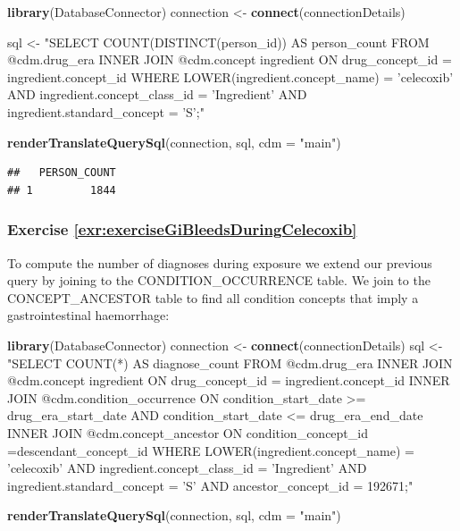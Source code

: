 \documentclass[11pt]{book}
\newenvironment{Shaded}{\begin{snugshade}}{\end{snugshade}}
\newcommand{\KeywordTok}[1]{\textcolor[rgb]{0.13,0.29,0.53}{\textbf{#1}}}
\newcommand{\DataTypeTok}[1]{\textcolor[rgb]{0.13,0.29,0.53}{#1}}
\newcommand{\StringTok}[1]{\textcolor[rgb]{0.31,0.60,0.02}{#1}}
\newcommand{\NormalTok}[1]{#1}
\theoremstyle{definition}
\theoremstyle{definition}
\theoremstyle{definition}
\theoremstyle{remark}
\begin{document}
\begin{Shaded}
\begin{Highlighting}[]
\KeywordTok{library}\NormalTok{(DatabaseConnector)}
\NormalTok{connection <-}\StringTok{ }\KeywordTok{connect}\NormalTok{(connectionDetails)}

\NormalTok{sql <-}\StringTok{ "SELECT COUNT(DISTINCT(person_id)) AS person_count}
\StringTok{FROM @cdm.drug_era}
\StringTok{INNER JOIN @cdm.concept ingredient}
\StringTok{  ON drug_concept_id = ingredient.concept_id}
\StringTok{WHERE LOWER(ingredient.concept_name) = 'celecoxib'}
\StringTok{  AND ingredient.concept_class_id = 'Ingredient'}
\StringTok{  AND ingredient.standard_concept = 'S';"}

\KeywordTok{renderTranslateQuerySql}\NormalTok{(connection, sql, }\DataTypeTok{cdm =} \StringTok{"main"}\NormalTok{)}
\end{Highlighting}
\end{Shaded}

\begin{verbatim}
##   PERSON_COUNT
## 1         1844
\end{verbatim}

\subsubsection*{Exercise
\ref{exr:exerciseGiBleedsDuringCelecoxib}}\label{exercise-refexrexercisegibleedsduringcelecoxib}

To compute the number of diagnoses during exposure we extend our
previous query by joining to the CONDITION\_OCCURRENCE table. We join to
the CONCEPT\_ANCESTOR table to find all condition concepts that imply a
gastrointestinal haemorrhage:

\begin{Shaded}
\begin{Highlighting}[]
\KeywordTok{library}\NormalTok{(DatabaseConnector)}
\NormalTok{connection <-}\StringTok{ }\KeywordTok{connect}\NormalTok{(connectionDetails)}
\NormalTok{sql <-}\StringTok{ "SELECT COUNT(*) AS diagnose_count}
\StringTok{FROM @cdm.drug_era}
\StringTok{INNER JOIN @cdm.concept ingredient}
\StringTok{  ON drug_concept_id = ingredient.concept_id}
\StringTok{INNER JOIN @cdm.condition_occurrence}
\StringTok{  ON condition_start_date >= drug_era_start_date}
\StringTok{    AND condition_start_date <= drug_era_end_date}
\StringTok{INNER JOIN @cdm.concept_ancestor }
\StringTok{  ON condition_concept_id =descendant_concept_id}
\StringTok{WHERE LOWER(ingredient.concept_name) = 'celecoxib'}
\StringTok{  AND ingredient.concept_class_id = 'Ingredient'}
\StringTok{  AND ingredient.standard_concept = 'S'}
\StringTok{  AND ancestor_concept_id = 192671;"}

\KeywordTok{renderTranslateQuerySql}\NormalTok{(connection, sql, }\DataTypeTok{cdm =} \StringTok{"main"}\NormalTok{)}
\end{Highlighting}
\end{Shaded}
\end{document}
